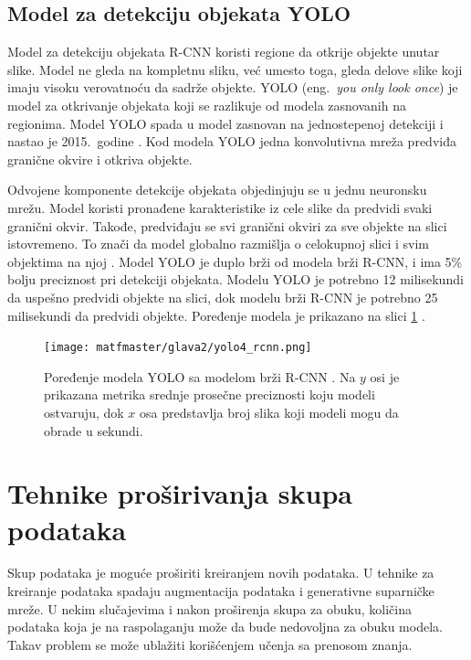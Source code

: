 \documentclass[12pt,oneside]{memoir}
\begin{document}
\section{Model za detekciju objekata YOLO}
Model za detekciju objekata R-CNN koristi regione da otkrije objekte unutar slike. Model ne gleda na kompletnu sliku, već umesto toga, gleda delove slike koji imaju visoku verovatnoću da sadrže objekte. YOLO (eng.~\textit{you only look once}) je model za otkrivanje objekata koji se razlikuje od modela zasnovanih na regionima. Model YOLO spada u model zasnovan na jednostepenoj detekciji i nastao je 2015.~godine \cite{redmon2016you}. Kod modela YOLO jedna konvolutivna mreža predviđa granične okvire i otkriva objekte.

Odvojene komponente detekcije objekata objedinjuju se u jednu neuronsku mrežu. Model koristi pronađene karakteristike iz cele slike da predvidi svaki granični okvir. Takođe, predviđaju se svi granični okviri za sve objekte na slici istovremeno. To znači da model globalno razmišlja o celokupnoj slici i svim objektima na njoj \cite{redmon2016you}. Model YOLO je duplo brži od modela brži R-CNN, i ima 5\% bolju preciznost pri detekciji objekata. Modelu YOLO je potrebno 12 milisekundi da uspešno predvidi objekte na slici, dok modelu brži R-CNN je potrebno 25 milisekundi da predvidi objekte. Poređenje modela je prikazano na slici \ref{fig:section2_YOLOvsRCNN} \cite{bdcc6030072}.

\begin{figure}[ht]
    \centering
    \texttt{[image: matfmaster/glava2/yolo4\_rcnn.png]}
    \caption{ Poređenje modela YOLO sa modelom brži R-CNN \cite{bdcc6030072}. Na $y$ osi je prikazana metrika srednje prosečne preciznosti koju modeli ostvaruju, dok $x$ osa predstavlja broj slika koji modeli mogu da obrade u sekundi.}
    \label{fig:section2_YOLOvsRCNN}
\end{figure}

\chapter{Tehnike proširivanja skupa podataka}
\label{section3}

Skup podataka je moguće proširiti kreiranjem novih podataka. U tehnike za kreiranje podataka spadaju augmentacija podataka i generativne suparničke mreže. U nekim slučajevima i nakon proširenja skupa za obuku, količina podataka koja je na raspolaganju može da bude nedovoljna za obuku modela. Takav problem se može ublažiti korišćenjem učenja sa prenosom znanja. 
\end{document}
